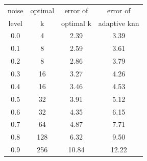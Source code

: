 \documentclass{article}
\begin{document}
\begin{figure}
\begin{center}
 \begin{tabular}{||c | c | c | c||} 
 \hline
 noise & optimal & error of  & error of \\ 
 level &    k    & optimal k & adaptive knn \\  [0.5ex] 
 \hline\hline
 0.0 &    4 &  2.39 &  3.39 \\ \hline
 0.1 &    8 &  2.59 &  3.61 \\ \hline
 0.2 &    8 &  2.86 &  3.79 \\ \hline
 0.3 &   16 &  3.27 &  4.26 \\ \hline
 0.4 &   16 &  3.46 &  4.53 \\ \hline
 0.5 &   32 &  3.91 &  5.12 \\ \hline
 0.6 &   32 &  4.35 &  6.15 \\ \hline
 0.7 &   64 &  4.87 &  7.71 \\ \hline
 0.8 &  128 &  6.32 &  9.50 \\ \hline
 0.9 &  256 & 10.84 & 12.22 \\ \hline
 \hline
\end{tabular}
\end{center}

\end{figure}
\end{document}
